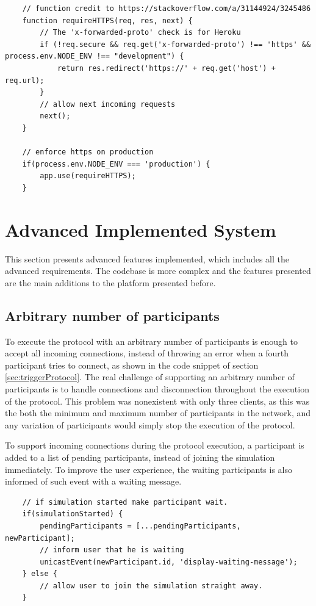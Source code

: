 \begin{lstlisting}
    // function credit to https://stackoverflow.com/a/31144924/3245486
    function requireHTTPS(req, res, next) {
        // The 'x-forwarded-proto' check is for Heroku
        if (!req.secure && req.get('x-forwarded-proto') !== 'https' && process.env.NODE_ENV !== "development") {
            return res.redirect('https://' + req.get('host') + req.url);
        }
        // allow next incoming requests
        next();
    }
    
    // enforce https on production
    if(process.env.NODE_ENV === 'production') {
        app.use(requireHTTPS);
    }
\end{lstlisting}


\section{Advanced Implemented System}
This section presents advanced features implemented, which includes all the advanced requirements. The codebase is more complex and the features presented are the main additions to the platform presented before.


\subsection{Arbitrary number of participants} \label{sec:arbitraryPartipantN}
To execute the protocol with an arbitrary number of participants is enough to accept all incoming connections, instead of throwing an error when a fourth participant tries to connect, as shown in the code snippet of section \ref{sec:triggerProtocol}. The real challenge of supporting an arbitrary number of participants is to handle connections and disconnection throughout the execution of the protocol. This problem was nonexistent with only three clients, as this was the both the minimum and maximum number of participants in the network, and any variation of participants would simply stop the execution of the protocol. \newline

To support incoming connections during the protocol execution, a participant is added to a list of pending participants, instead of joining the simulation immediately. To improve the user experience, the waiting participants is also informed of such event with a waiting message.

\begin{lstlisting}
    // if simulation started make participant wait.
    if(simulationStarted) {
        pendingParticipants = [...pendingParticipants, newParticipant];
        // inform user that he is waiting 
        unicastEvent(newParticipant.id, 'display-waiting-message');
    } else {
        // allow user to join the simulation straight away.
    }
\end{lstlisting}

